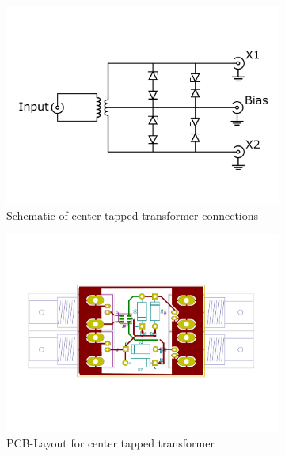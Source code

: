\begin{figure}[ht]
	\centering
	\begin{subfigure}{0.4\textwidth}
		\centering
		\includegraphics[width=\textwidth]{Chapters/Deflection/circuit_CTT4zu3}
		\caption{Schematic of center tapped transformer connections}
		\label{fig:circuit_ctt}
	\end{subfigure}
	\hspace{0.1\textwidth}
	\begin{subfigure}{0.4\textwidth}
		\centering
		\includegraphics[width=\textwidth]{Chapters/Deflection/PCB_CTT3}
		\caption{PCB-Layout for center tapped transformer}
		\label{fig:PCB_CTT}
	\end{subfigure}
	\caption{}
	\label{fig:CTT}
\end{figure}

